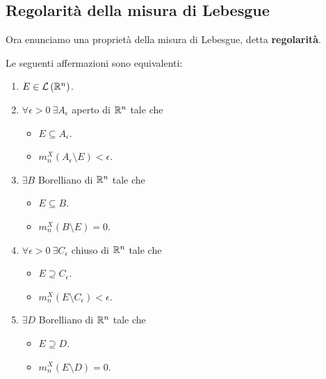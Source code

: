 \subsection{Regolarità della misura di Lebesgue}
Ora enunciamo una proprietà della misura di Lebesgue, detta \textbf{regolarità}.
\begin{theorema}\label{regolaritàlebesgue}
	Le seguenti affermazioni sono equivalenti:
	\begin{enumerate}
		\item $E\in\mathcal{L}\left(\mathbb{R}^n\right)$.
		\item $\forall \epsilon > 0\ \exists A_{\epsilon}$ aperto di $\mathbb{R}^n$ tale che
		\begin{itemize}
			\item $E\subseteq A_{\epsilon}$.
			\item $m^{X}_n\left(A_{\epsilon}\setminus E\right)<\epsilon$.
		\end{itemize}
		\item $\exists B$ Borelliano di $\mathbb{R}^n$ tale che
	\begin{itemize}
		\item $E\subseteq B$.
		\item $m^{X}_n\left(B\setminus E\right)=0$.
	\end{itemize}
	\item $\forall \epsilon > 0\ \exists C_{\epsilon}$ chiuso di $\mathbb{R}^n$ tale che
	\begin{itemize}
		\item $E\supseteq C_{\epsilon}$.
		\item $m^{X}_n\left(E\setminus C_{\epsilon}\right)<\epsilon$.
	\end{itemize}
	\item $\exists D$ Borelliano di $\mathbb{R}^n$ tale che
	\begin{itemize}
		\item $E\supseteq D$.
		\item $m^{X}_n\left(E\setminus D\right)=0$.
	\end{itemize}
	\end{enumerate}
\end{theorema}
\begin{demonstration}
\end{demonstration}
